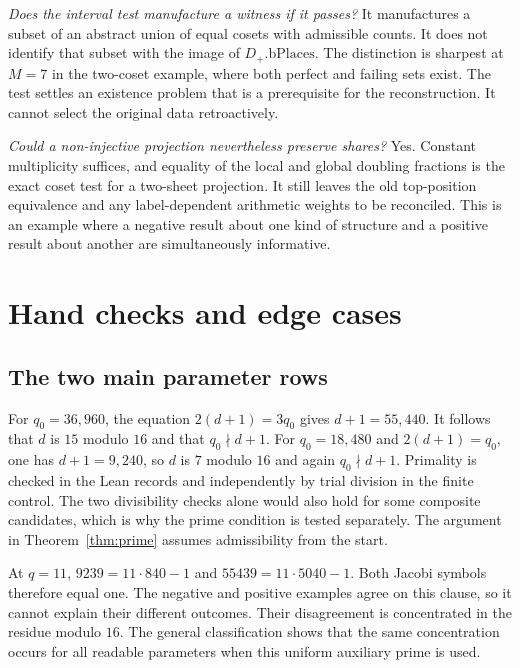 \documentclass[12pt,letterpaper]{article}
\begin{document}
\emph{Does the interval test manufacture a witness if it passes?} It manufactures a subset of an abstract union of equal cosets with admissible counts. It does not identify that subset with the image of $D_+.\mathrm{bPlaces}$. The distinction is sharpest at $M=7$ in the two-coset example, where both perfect and failing sets exist. The test settles an existence problem that is a prerequisite for the reconstruction. It cannot select the original data retroactively.

\emph{Could a non-injective projection nevertheless preserve shares?} Yes. Constant multiplicity suffices, and equality of the local and global doubling fractions is the exact coset test for a two-sheet projection. It still leaves the old top-position equivalence and any label-dependent arithmetic weights to be reconciled. This is an example where a negative result about one kind of structure and a positive result about another are simultaneously informative.

\appendix
\section{Hand checks and edge cases}
\subsection{The two main parameter rows}
For $q_0=36{,}960$, the equation $2(d+1)=3q_0$ gives $d+1=55{,}440$. It follows that $d$ is $15$ modulo $16$ and that $q_0\nmid d+1$. For $q_0=18{,}480$ and $2(d+1)=q_0$, one has $d+1=9{,}240$, so $d$ is $7$ modulo $16$ and again $q_0\nmid d+1$. Primality is checked in the Lean records and independently by trial division in the finite control. The two divisibility checks alone would also hold for some composite candidates, which is why the prime condition is tested separately. The argument in Theorem~\ref{thm:prime} assumes admissibility from the start.

At $q=11$, $9239=11\cdot840-1$ and $55439=11\cdot5040-1$. Both Jacobi symbols therefore equal one. The negative and positive examples agree on this clause, so it cannot explain their different outcomes. Their disagreement is concentrated in the residue modulo $16$. The general classification shows that the same concentration occurs for all readable parameters when this uniform auxiliary prime is used.
\end{document}
